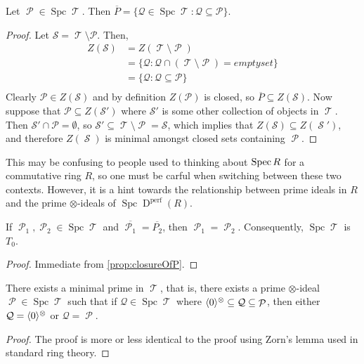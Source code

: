 \documentclass[11pt]{article}
\DeclareMathOperator{\cS}{\mathcal{S}}
\DeclareMathOperator{\TT}{\mathcal{T}}
\DeclareMathOperator{\cP}{\mathcal{P}}
\DeclareMathOperator{\spc}{Spc}
\begin{document}
\begin{prop}\label{prop:closureOfP}
Let $\cP \in \spc \TT$. Then $\overline{P} = \{\mathcal{Q} \in \spc \TT: \mathcal{Q} \subseteq \mathcal{P}\}$.
\end{prop}
\begin{proof}
Let $\mathcal{S} = \TT \setminus \mathcal{P}$. Then, 
\begin{align*}
Z(\mathcal{S}) 	&= Z(\TT \setminus \cP)\\
		&= \{\mathcal{Q}: \mathcal{Q} \cap (\TT \setminus \cP) = emptyset\}\\
		&= \{\mathcal{Q}: \mathcal{Q} \subseteq \mathcal{P}\}\\
\end{align*}
Clearly $\mathcal{P} \in Z(\mathcal{S})$ and by definition $Z(\mathscr{P})$ is closed, so $\overline{P} \subseteq Z(\mathcal{S})$. Now suppose that $\mathcal{P} \subseteq Z(\mathcal{S}')$ where $\mathcal{S}'$ is some other collection of objects in $\TT$. Then $\mathcal{S}' \cap \mathcal{P} = \emptyset$, so $\mathcal{S}' \subseteq \TT \setminus \cP = \mathcal{S}$, which implies that $Z(\mathcal{S}) \subseteq Z (\cS')$, and therefore $Z(\cS)$ is minimal amongst closed sets containing $\cP$.
\end{proof}

\begin{rmk}
This may be confusing to people used to thinking about $\operatorname{Spec} R$ for a commutative ring $R$, so one must be carful when switching between these two contexts. However, it is a hint towards the relationship between prime ideals in $R$ and the prime $\otimes$-ideals of $\spc \operatorname{D}^{\text{perf}}(R)$.
\end{rmk}

\begin{cor}\label{cor:UniqueGenericPoint}
	If $\cP_1,\cP_2 \in \spc \TT$ and $\overline{\cP_1} = \overline{P_2}$, then $\cP_1 = \cP_2$. Consequently, $\spc\TT$ is $T_0$.
\end{cor}
\begin{proof}
Immediate from \autoref{prop:closureOfP}.
\end{proof}

\begin{prop}
There exists a minimal prime in $\TT$, that is, there exists a prime $\otimes$-ideal $\cP \in \spc \TT$ such that if $\mathcal{Q} \in \spc \TT$ where $\la 0 \ra^{\otimes} \subseteq\mathcal{Q} \subseteq \cP$, then either $\mathcal{Q} = \langle 0 \rangle^{\otimes}$ or $\mathcal{Q} = \cP$.
\end{prop}
\begin{proof}
	The proof is more or less identical to the proof using Zorn's lemma used in standard ring theory.
\end{proof}
\end{document}
